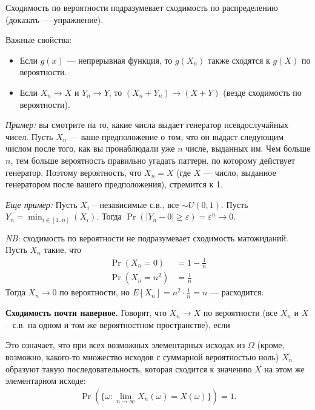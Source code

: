 \documentclass[12pt]{article}
\newcommand\eps{\varepsilon}
\begin{document}
Сходимость по вероятности подразумевает сходимость по распределению (доказать --- упражнение).

Важные свойства: 
\begin{itemize}
  \item Если $g(x)$ --- непрерывная функция, то $g(X_n)$ также сходятся к $g(X)$ по вероятности.
  \item Если $X_n \to X$ и $Y_n \to Y$, то $(X_n + Y_n) \to (X + Y)$ (везде сходимость по вероятности).
\end{itemize}

\emph{Пример:} вы смотрите на то, какие числа выдает генератор псевдослучайных чисел. Пусть $X_n$ --- ваше предположение о том, что он выдаст следующим числом после того, как вы пронаблюдали уже $n$ числе, выданных им. Чем больше $n$, тем больше вероятность правильно угадать паттерн, по которому действует генератор. Поэтому вероятность, что $X_n = X$ (где $X$ --- число, выданное генератором после вашего предположения), стремится к 1.

\emph{Еще пример:} Пусть $X_i$ -- независимые с.в., все $\sim U(0, 1)$. Пусть $Y_n = \min_{i \in [1..n]}(X_i)$. Тогда $\Pr(|Y_n - 0| \ge \eps) = \eps^n \to 0$. 

\emph{NB:} сходимость по вероятности не подразумевает сходимость матожиданий. Пусть $X_n$ такие, что
\begin{align*}
  \Pr(X_n = 0) &= 1 - \frac{1}{n} \\
  \Pr(X_n = n^2) &= \frac 1n
\end{align*}
Тогда $X_n \to 0$ по вероятности, но $E[X_n] = n^2 \cdot \frac 1n = n$ --- расходится.

\textbf{Сходимость почти наверное.}
Говорят, что $X_n \to X$ по вероятности (все $X_n$ и $X$ -- с.в. на одном и том же вероятностном пространстве), если 
\begin{center}
\end{center}
Это означает, что при всех возможных элементарных исходах из $\Omega$ (кроме, возможно, какого-то множество исходов с суммарной вероятностью ноль) $X_n$ образуют такую последовательность, которая сходится к значению $X$ на этом же элементарном исходе:
\begin{align*}
  \Pr\left(\{\omega: \lim_{n \to \infty} X_n(\omega) = X(\omega)\}\right) = 1.
\end{align*}
\end{document}
